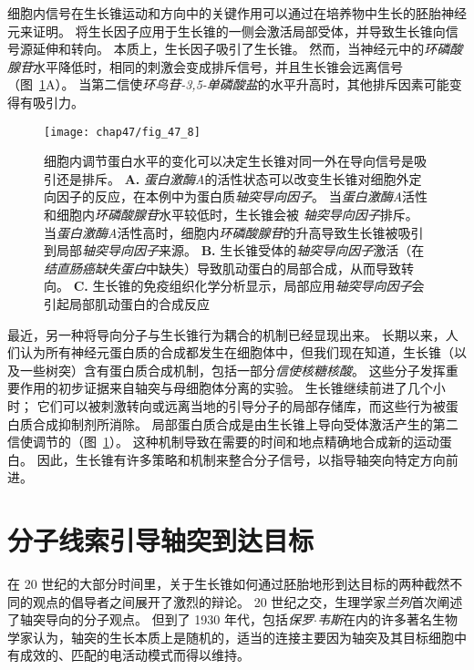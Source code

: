 细胞内信号在生长锥运动和方向中的关键作用可以通过在培养物中生长的胚胎神经元来证明。
将生长因子应用于生长锥的一侧会激活局部受体，并导致生长锥向信号源延伸和转向。
本质上，生长因子吸引了生长锥。
然而，当神经元中的\textit{环磷酸腺苷}水平降低时，相同的刺激会变成排斥信号，并且生长锥会远离信号（图~\ref{fig:47_8}A）。
当第二信使\textit{环鸟苷-3,5-单磷酸盐}的水平升高时，其他排斥因素可能变得有吸引力。


\begin{figure}[htbp]
	\centering
	\texttt{[image: chap47/fig\_47\_8]}
	\caption{细胞内调节蛋白水平的变化可以决定生长锥对同一外在导向信号是吸引还是排斥。
		\textbf{A.} \textit{蛋白激酶A}的活性状态可以改变生长锥对细胞外定向因子的反应，在本例中为蛋白质\textit{轴突导向因子}。
		当\textit{蛋白激酶A}活性和细胞内\textit{环磷酸腺苷}水平较低时，生长锥会被 \textit{轴突导向因子}排斥。
		当\textit{蛋白激酶A}活性高时，细胞内\textit{环磷酸腺苷}的升高导致生长锥被吸引到局部\textit{轴突导向因子}来源\cite{ming1997camp}。
		\textbf{B.} 生长锥受体的\textit{轴突导向因子}激活（在\textit{结直肠癌缺失蛋白}中缺失）导致肌动蛋白的局部合成，从而导致转向。
		\textbf{C.} 生长锥的免疫组织化学分析显示，局部应用\textit{轴突导向因子}会引起局部肌动蛋白的合成反应\cite{leung2006asymmetrical} }
	\label{fig:47_8}
\end{figure}


最近，另一种将导向分子与生长锥行为耦合的机制已经显现出来。
长期以来，人们认为所有神经元蛋白质的合成都发生在细胞体中，但我们现在知道，生长锥（以及一些树突）含有蛋白质合成机制，包括一部分\textit{信使核糖核酸}。
这些分子发挥重要作用的初步证据来自轴突与母细胞体分离的实验。
生长锥继续前进了几个小时； 它们可以被刺激转向或远离当地的引导分子的局部存储库，而这些行为被蛋白质合成抑制剂所消除。
局部蛋白质合成是由生长锥上导向受体激活产生的第二信使调节的（图~\ref{fig:47_8}）。
这种机制导致在需要的时间和地点精确地合成新的运动蛋白。
因此，生长锥有许多策略和机制来整合分子信号，以指导轴突向特定方向前进。



\section{分子线索引导轴突到达目标}

在 20 世纪的大部分时间里，关于生长锥如何通过胚胎地形到达目标的两种截然不同的观点的倡导者之间展开了激烈的辩论。
20 世纪之交，生理学家\textit{兰列}首次阐述了轴突导向的分子观点。
但到了 1930 年代，包括\textit{保罗$\cdot$韦斯}在内的许多著名生物学家认为，轴突的生长本质上是随机的，适当的连接主要因为轴突及其目标细胞中有成效的、匹配的电活动模式而得以维持。


